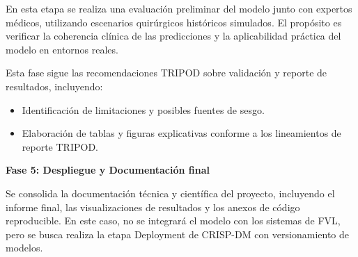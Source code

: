 En esta etapa se realiza una evaluación preliminar del modelo junto con expertos médicos, utilizando escenarios quirúrgicos históricos simulados. El propósito es verificar la coherencia clínica de las predicciones y la aplicabilidad práctica del modelo en entornos reales.

Esta fase sigue las recomendaciones TRIPOD sobre validación y reporte de resultados, incluyendo:

\begin{itemize}
    \item Identificación de limitaciones y posibles fuentes de sesgo.
    \item Elaboración de tablas y figuras explicativas conforme a los lineamientos de reporte TRIPOD.
\end{itemize}

\textbf{Fase 5: Despliegue y Documentación final}

Se consolida la documentación técnica y científica del proyecto, incluyendo el informe final, las visualizaciones de resultados y los anexos de código reproducible. En este caso, no se integrará el modelo con los sistemas de FVL, pero se busca realiza la etapa Deployment de CRISP-DM con versionamiento de modelos.

\newpage

